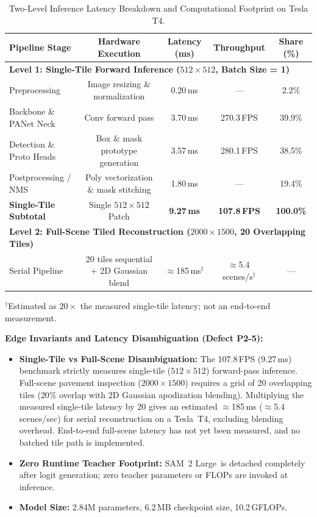 \documentclass[11pt,a4paper]{article}
\newcommand{\sam}{SAM~2 Large}
\begin{document}
\begin{table}[H]
\centering
\small
\caption{Two-Level Inference Latency Breakdown and Computational Footprint on Tesla T4.}
\label{tab:speed}
\begin{tabular}{lcccc}
\toprule
\textbf{Pipeline Stage} & \textbf{Hardware Execution} & \textbf{Latency (ms)} & \textbf{Throughput} & \textbf{Share (\%)} \\
\midrule
\multicolumn{5}{l}{\textbf{Level 1: Single-Tile Forward Inference ($512\times512$, Batch Size = 1)}} \\
Preprocessing & Image resizing \& normalization & 0.20\,ms & --- & 2.2\% \\
Backbone \& PANet Neck & Conv forward pass & 3.70\,ms & 270.3\,FPS & 39.9\% \\
Detection \& Proto Heads & Box \& mask prototype generation & 3.57\,ms & 280.1\,FPS & 38.5\% \\
Postprocessing / NMS & Poly vectorization \& mask stitching & 1.80\,ms & --- & 19.4\% \\
\midrule
\textbf{Single-Tile Subtotal} & Single $512\times512$ Patch & \textbf{9.27\,ms} & \textbf{107.8\,FPS} & \textbf{100.0\%} \\
\midrule
\multicolumn{5}{l}{\textbf{Level 2: Full-Scene Tiled Reconstruction ($2000\times1500$, 20 Overlapping Tiles)}} \\
Serial Pipeline & 20 tiles sequential + 2D Gaussian blend & $\approx$185\,ms$^\dagger$ & $\approx$5.4\,scenes/s$^\dagger$ & --- \\
\bottomrule
\end{tabular}

\vspace{2pt}
{\footnotesize $^\dagger$Estimated as $20\times$ the measured single-tile latency; not an end-to-end measurement.}
\end{table}

\noindent\textbf{Edge Invariants and Latency Disambiguation (Defect P2-5):}
\begin{itemize}[leftmargin=1.5em]
  \item \textbf{Single-Tile vs Full-Scene Disambiguation:} The 107.8\,FPS (9.27\,ms) benchmark strictly measures single-tile ($512\times512$) forward-pass inference. Full-scene pavement inspection ($2000\times1500$) requires a grid of 20 overlapping tiles ($20\%$ overlap with 2D Gaussian apodization blending). Multiplying the measured single-tile latency by 20 gives an estimated $\approx$185\,ms ($\approx$5.4\,scenes/sec) for serial reconstruction on a Tesla~T4, excluding blending overhead. End-to-end full-scene latency has not yet been measured, and no batched tile path is implemented.
  \item \textbf{Zero Runtime Teacher Footprint:} \sam\ is detached completely after logit generation; zero teacher parameters or FLOPs are invoked at inference.
  \item \textbf{Model Size:} 2.84M parameters, 6.2\,MB checkpoint size, 10.2\,GFLOPs.
\end{itemize}
\end{document}

